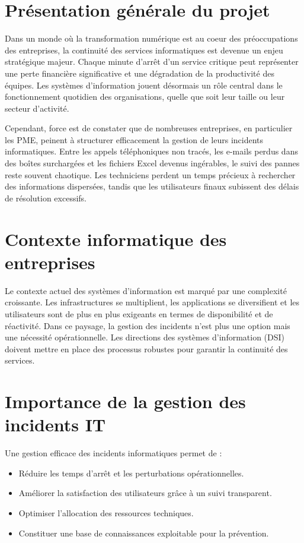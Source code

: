 \documentclass[12pt,a4paper,oneside]{report}
\begin{document}
\section{Présentation générale du projet}

Dans un monde où la transformation numérique est au coeur des préoccupations des entreprises, la continuité des services informatiques est devenue un enjeu stratégique majeur. Chaque minute d'arrêt d'un service critique peut représenter une perte financière significative et une dégradation de la productivité des équipes. Les systèmes d'information jouent désormais un rôle central dans le fonctionnement quotidien des organisations, quelle que soit leur taille ou leur secteur d'activité.

Cependant, force est de constater que de nombreuses entreprises, en particulier les PME, peinent à structurer efficacement la gestion de leurs incidents informatiques. Entre les appels téléphoniques non tracés, les e-mails perdus dans des boîtes surchargées et les fichiers Excel devenus ingérables, le suivi des pannes reste souvent chaotique. Les techniciens perdent un temps précieux à rechercher des informations dispersées, tandis que les utilisateurs finaux subissent des délais de résolution excessifs.

\section{Contexte informatique des entreprises}

Le contexte actuel des systèmes d'information est marqué par une complexité croissante. Les infrastructures se multiplient, les applications se diversifient et les utilisateurs sont de plus en plus exigeants en termes de disponibilité et de réactivité. Dans ce paysage, la gestion des incidents n'est plus une option mais une nécessité opérationnelle. Les directions des systèmes d'information (DSI) doivent mettre en place des processus robustes pour garantir la continuité des services.

\section{Importance de la gestion des incidents IT}

Une gestion efficace des incidents informatiques permet de :
\begin{itemize}
    \item Réduire les temps d'arrêt et les perturbations opérationnelles.
    \item Améliorer la satisfaction des utilisateurs grâce à un suivi transparent.
    \item Optimiser l'allocation des ressources techniques.
    \item Constituer une base de connaissances exploitable pour la prévention.
\end{itemize}
\end{document}
